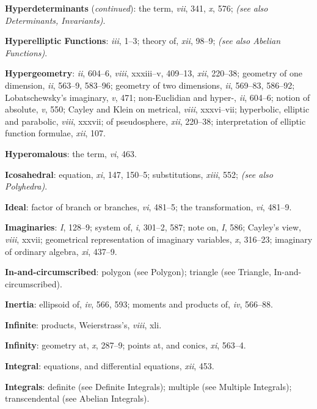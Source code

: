 \documentclass[11pt,a4paper]{article}
\newcommand{\IndexEntry}[1]{\textbf{#1}}
\newcommand{\SeeAlso}[1]{\textit{(see also #1)}}
\newcommand{\V}[1]{\textit{#1}} %
\begin{document}
\newpage

\setcounter{page}{104}

\IndexEntry{Hyperdeterminants} (\textit{continued}): the term, \V{vii}, 341, \V{x}, 576; \SeeAlso{Determinants, Invariants}.

\IndexEntry{Hyperelliptic Functions}: \V{iii}, 1--3; theory of, \V{xii}, 98--9; \SeeAlso{Abelian Functions}.

\IndexEntry{Hypergeometry}: \V{ii}, 604--6, \V{viii}, xxxiii--v, 409--13, \V{xii}, 220--38; geometry of one dimension, \V{ii}, 563--9, 583--96; geometry of two dimensions, \V{ii}, 569--83, 586--92; Lobatschewsky's imaginary, \V{v}, 471; non-Euclidian and hyper-, \V{ii}, 604--6; notion of absolute, \V{v}, 550; Cayley and Klein on metrical, \V{viii}, xxxvi--vii; hyperbolic, elliptic and parabolic, \V{viii}, xxxvii; of pseudosphere, \V{xii}, 220--38; interpretation of elliptic function formulae, \V{xii}, 107.

\IndexEntry{Hyperomalous}: the term, \V{vi}, 463.

\IndexEntry{Icosahedral}: equation, \V{xi}, 147, 150--5; substitutions, \V{xiii}, 552; \SeeAlso{Polyhedra}.

\IndexEntry{Ideal}: factor of branch or branches, \V{vi}, 481--5; the transformation, \V{vi}, 481--9.

\IndexEntry{Imaginaries}: \V{I}, 128--9; system of, \V{i}, 301--2, 587; note on, \V{I}, 586; Cayley's view, \V{viii}, xxvii; geometrical representation of imaginary variables, \V{x}, 316--23; imaginary of ordinary algebra, \V{xi}, 437--9.

\IndexEntry{In-and-circumscribed}: polygon (see Polygon); triangle (see Triangle, In-and-circumscribed).

\IndexEntry{Inertia}: ellipsoid of, \V{iv}, 566, 593; moments and products of, \V{iv}, 566--88.

\IndexEntry{Infinite}: products, Weierstrass's, \V{viii}, xli.

\IndexEntry{Infinity}: geometry at, \V{x}, 287--9; points at, and conics, \V{xi}, 563--4.

\IndexEntry{Integral}: equations, and differential equations, \V{xii}, 453.

\IndexEntry{Integrals}: definite (see Definite Integrals); multiple (see Multiple Integrals); transcendental (see Abelian Integrals).
\end{document}
